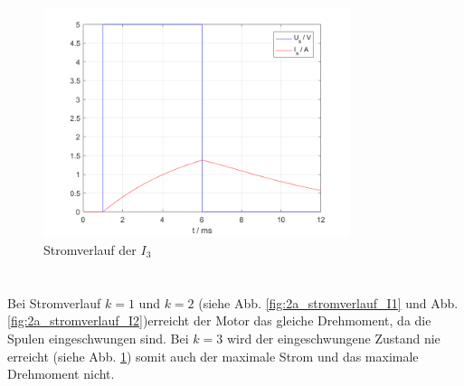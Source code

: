 \begin{figure}[!h]
	\centering
	\includegraphics[width=0.8\textwidth]{./Bilder/2a_Stromverlauf_3}
	\caption{Stromverlauf der $I_3$}
	\label{fig:2a_stromverlauf_I3}
\end{figure}
%
\section{}\label{sec:aufg2b}
\enlargethispage{1em}
%
Bei Stromverlauf $k = 1$ und $k = 2$  (siehe Abb. \ref{fig:2a_stromverlauf_I1} und Abb. \ref{fig:2a_stromverlauf_I2})erreicht der Motor das gleiche Drehmoment, da die Spulen eingeschwungen sind. Bei $k = 3$ wird der eingeschwungene Zustand nie erreicht (siehe Abb. \ref{fig:2a_stromverlauf_I3}) somit auch der maximale Strom und das maximale Drehmoment nicht. 
%

\clearpage